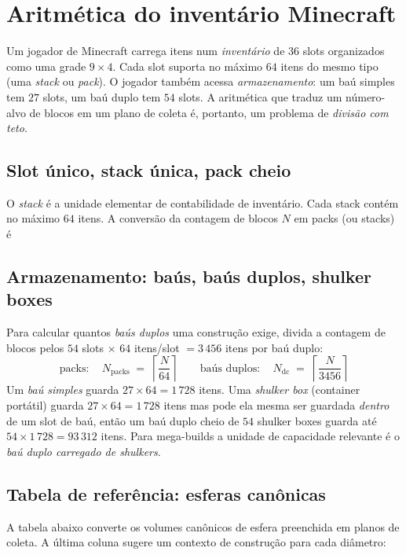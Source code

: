 \documentclass[12pt,a4paper]{scrartcl}
\begin{document}
\clearpage

\section{Aritmética do inventário Minecraft}

Um jogador de Minecraft carrega itens num \emph{inventário} de 36 slots organizados como uma grade $9 \times 4$. Cada slot suporta no máximo $64$ itens do mesmo tipo (uma \emph{stack} ou \emph{pack}). O jogador também acessa \emph{armazenamento}: um baú simples tem $27$ slots, um baú duplo tem $54$ slots. A aritmética que traduz um número-alvo de blocos em um plano de coleta é, portanto, um problema de \emph{divisão com teto}.

\subsection{Slot único, stack única, pack cheio}
O \emph{stack} é a unidade elementar de contabilidade de inventário. Cada stack contém no máximo $64$ itens. A conversão da contagem de blocos $N$ em packs (ou stacks) é

\subsection{Armazenamento: baús, baús duplos, shulker boxes}
Para calcular quantos \emph{baús duplos} uma construção exige, divida a contagem de blocos pelos $54$ slots $\times$ $64$ itens/slot $= 3\,456$ itens por baú duplo:
\[
\text{packs}:\quad N_{\mathrm{packs}} \;=\; \left\lceil \dfrac{N}{64} \right\rceil
\qquad
\text{baús duplos}:\quad N_{\mathrm{dc}} \;=\; \left\lceil \dfrac{N}{3456} \right\rceil
\]
Um \emph{baú simples} guarda $27 \times 64 = 1\,728$ itens. Uma \emph{shulker box} (container portátil) guarda $27 \times 64 = 1\,728$ itens mas pode ela mesma ser guardada \emph{dentro} de um slot de baú, então um baú duplo cheio de $54$ shulker boxes guarda até $54 \times 1\,728 = 93\,312$ itens. Para mega-builds a unidade de capacidade relevante é o \emph{baú duplo carregado de shulkers}.

\subsection{Tabela de referência: esferas canônicas}
A tabela abaixo converte os volumes canônicos de esfera preenchida em planos de coleta. A última coluna sugere um contexto de construção para cada diâmetro:
\nopagebreak
\end{document}
